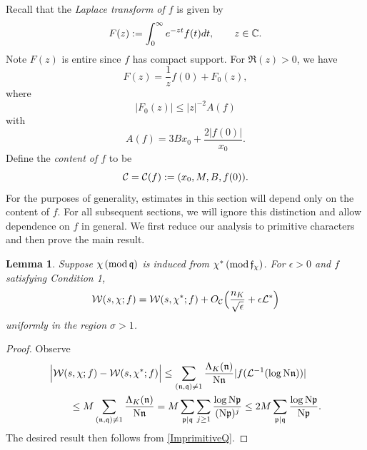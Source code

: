 \documentclass[12pt,psamsfonts]{amsart}
\newtheorem{lem}[thm]{Lemma}
\theoremstyle{definition}
\theoremstyle{remark}
\numberwithin{equation}{section}
\begin{document}
Recall that the \emph{Laplace transform of $f$} is given by
\begin{equation}
F(z) :=  \int_0^{\infty} e^{-zt} f(t) dt, \qquad z \in \mathbb{C}. 
\label{Laplace}
\end{equation}
Note $F(z)$ is entire since $f$ has compact support. For $\Re(z) > 0$, we have
\begin{equation}
F(z) = \frac{1}{z} f(0) + F_0(z),
\label{F0Laplace}
\end{equation}
where 
\begin{equation}
|F_0(z)| \leq |z|^{-2} A(f)
\label{BoundF0}
\end{equation}
with
\[
A(f) = 3Bx_0 + \frac{2|f(0)|}{x_0}. 
\]
Define the \emph{content of $f$} to be 
\begin{equation}
\mathcal{C} = \mathcal{C}(f) := (x_0, M, B, f(0)).
\label{ContentofF}
\end{equation}
For the purposes of generality, estimates in this section will depend only on the content of $f$. For all subsequent sections, we will ignore this distinction and allow dependence on $f$ in general.  We first reduce our analysis to primitive characters and then prove the main result.
\begin{lem} Suppose $\chi \, (\mathrm{mod} {\, \mathfrak{q}})$ is induced from $\chi^* \, (\mathrm{mod} {\, \mathfrak{f}_{\chi}})$. For $\epsilon > 0$ and $f$ satisfying Condition 1, 
\[
\mathcal{W}(s, \chi; f) = \mathcal{W}(s,\chi^*; f) + O_{\mathcal{C}}\Big( \frac{n_K}{\sqrt{\epsilon}} + \epsilon \mathcal{L}^* \Big)
\]
uniformly in the region $\sigma > 1$. 
\label{Reduce2Prim}
\end{lem}
\begin{proof} Observe 
\[
\begin{aligned}
& \Big| \mathcal{W}(s,\chi; f) -  \mathcal{W}(s,\chi^*; f)\Big| \leq \sum_{ (\mathfrak{n},\mathfrak{q}) \neq 1}\frac{\Lambda_K(\mathfrak{n})}{\mathrm{N}\mathfrak{n}} |f( \mathcal{L}^{-1}(\log \mathrm{N}\mathfrak{n}))|  \\
& \qquad  \leq M\sum_{ (\mathfrak{n},\mathfrak{q}) \neq 1} \frac{\Lambda_K(\mathfrak{n})}{\mathrm{N}\mathfrak{n}} 
= M\sum_{ \mathfrak{p} \mid \mathfrak{q}} \sum_{j \geq 1} \frac{\log \mathrm{N}\mathfrak{p}}{(\mathrm{N}\mathfrak{p})^{j}}  \leq 2M \sum_{\mathfrak{p} \mid \mathfrak{q}} \frac{\log \mathrm{N}\mathfrak{p}}{\mathrm{N}\mathfrak{p}}. 
 \end{aligned}
\]
The desired result then follows from \cref{ImprimitiveQ}. 
\end{proof}
\end{document}
